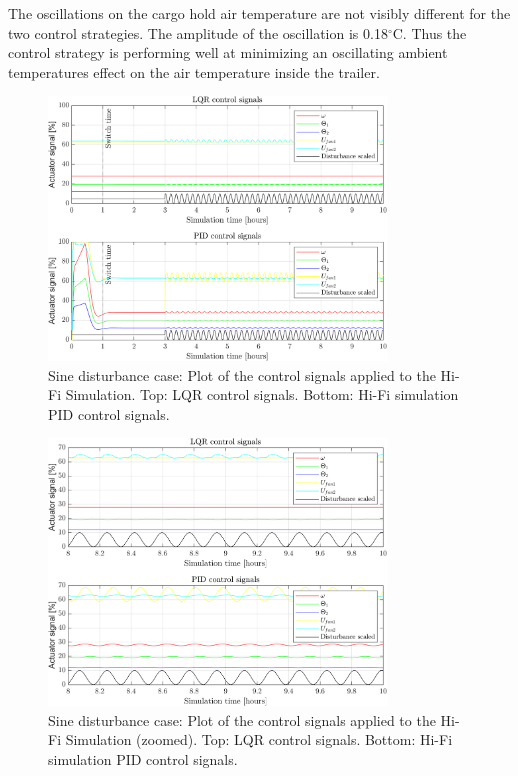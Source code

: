 The oscillations on the cargo hold air temperature are not visibly different for the two control strategies. The amplitude of the oscillation is 0.18$^{\circ}$C. Thus the control strategy is performing well at minimizing an oscillating ambient temperatures effect on the air temperature inside the trailer.

\begin{figure}[H]
	\centering
	\includegraphics[width=0.8\textwidth]{Graphics/fig_inputs_sineDist.png}
	\caption{Sine disturbance case: Plot of the control signals applied to the Hi-Fi Simulation. Top: LQR control signals. Bottom: Hi-Fi simulation PID control signals.}
	\label{fig:inputs_sineDist}
\end{figure}

\begin{figure}[H]
	\centering
	\includegraphics[width=0.8\textwidth]{Graphics/fig_inputs_sineDist_zoom.png}
	\caption{Sine disturbance case: Plot of the control signals applied to the Hi-Fi Simulation (zoomed). Top: LQR control signals. Bottom: Hi-Fi simulation PID control signals.}
	\label{fig:inputs_sineDist_zoom}
\end{figure}



